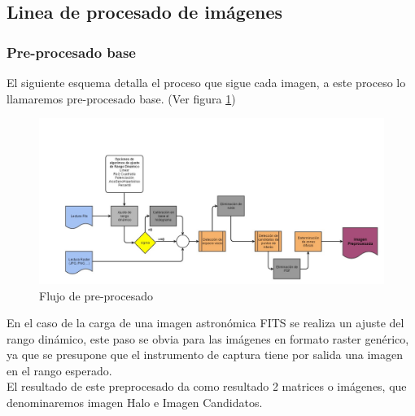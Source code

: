 	\subsection{Linea de procesado de imágenes}
	\subsubsection{Pre-procesado base}
	El siguiente esquema detalla el proceso que sigue cada imagen, a este proceso lo llamaremos pre-procesado base. (Ver figura \ref{fig:esquemaPreprocesado})\\
	\begin{figure}[!htb]
		\centering
		\includegraphics[width=1\textwidth]{images/tfg2016pipeline1.jpg}
		\caption{\label{fig:esquemaPreprocesado}Flujo de pre-procesado}
	\end{figure}
	En el caso de la carga de una imagen astronómica FITS se realiza un ajuste del rango dinámico, este paso se obvia para las imágenes en formato raster genérico, ya que se presupone que el instrumento de captura tiene por salida una imagen en el rango esperado.\\
	El resultado de este preprocesado da como resultado 2 matrices o imágenes, que denominaremos imagen Halo e Imagen Candidatos.
